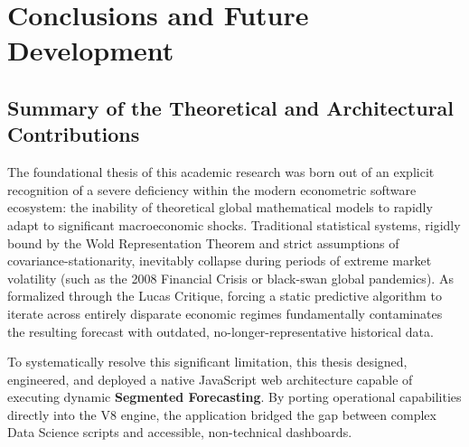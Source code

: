 \chapter{Conclusions and Future Development}
\label{ch:conclusions}

\section{Summary of the Theoretical and Architectural Contributions}
The foundational thesis of this academic research was born out of an explicit recognition of a severe deficiency within the modern econometric software ecosystem: the inability of theoretical global mathematical models to rapidly adapt to significant macroeconomic shocks. Traditional statistical systems, rigidly bound by the Wold Representation Theorem and strict assumptions of covariance-stationarity, inevitably collapse during periods of extreme market volatility (such as the 2008 Financial Crisis or black-swan global pandemics). As formalized through the Lucas Critique, forcing a static predictive algorithm to iterate across entirely disparate economic regimes fundamentally contaminates the resulting forecast with outdated, no-longer-representative historical data. 

To systematically resolve this significant limitation, this thesis designed, engineered, and deployed a native JavaScript web architecture capable of executing dynamic \textbf{Segmented Forecasting}. By porting operational capabilities directly into the V8 engine, the application bridged the gap between complex Data Science scripts and accessible, non-technical dashboards. 


